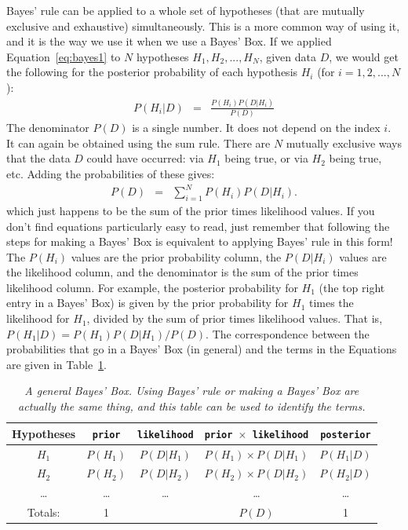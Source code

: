 Bayes' rule can be applied to a whole set
of hypotheses (that are mutually exclusive and exhaustive) simultaneously.
This is a more common way of using it, and it is the way we use it when we use
a Bayes' Box. If we applied Equation~\ref{eq:bayes1} to $N$ hypotheses
$H_1, H_2, ..., H_N$, given data $D$, we would get the following for the posterior
probability of each hypothesis $H_i$ (for $i=1, 2, ..., N$):
\begin{eqnarray}
P(H_i|D) &=& \frac{P(H_i)P(D|H_i)}{P(D)}
\end{eqnarray}
The denominator $P(D)$ is a single number. It does not depend on the index $i$.
It can again be obtained using the sum rule. There are $N$
mutually exclusive ways that the data $D$ could have occurred: via $H_1$ being
true, or via $H_2$ being true, etc. Adding the probabilities of these gives:
\begin{eqnarray}
P(D) &=& \sum_{i=1}^N P(H_i)P(D|H_i).
\end{eqnarray}
which just happens to be the sum of the prior times likelihood values.
If you don't find equations particularly easy to read, just remember that
following the steps for making a Bayes' Box is equivalent to applying
Bayes' rule in this form! The $P(H_i)$ values are the prior probability column, the
$P(D|H_i)$ values are the likelihood column, and the denominator is the
sum of the prior times likelihood column. For example, the posterior probability
for $H_1$ (the top right entry in a Bayes' Box) is given by the prior probability
for $H_1$ times the likelihood for $H_1$, divided by the sum of prior times
likelihood values. That is, $P(H_1|D) = P(H_1)P(D|H_1)/P(D)$.
The correspondence between the probabilities that go in a Bayes'
Box (in general) and the terms in the Equations are given in
Table~\ref{tab:general_bayes_box}.

\begin{table}[!ht]
\begin{center}
\begin{tabular}{|c|c|c|c|c|}
\hline
{\bf Hypotheses} & {\tt prior} & {\tt likelihood} &
{\tt prior $\times$ likelihood} & {\tt posterior}\\
\hline
$H_1$ & $P(H_1)$ & $P(D|H_1)$ & $P(H_1)\times P(D|H_1)$ & $P(H_1|D)$\\
$H_2$ & $P(H_2)$ & $P(D|H_2)$ & $P(H_2)\times P(D|H_2)$ & $P(H_2|D)$\\
\ldots & \ldots & \ldots & \ldots & \ldots\\
\hline
Totals: & 1 & & $P(D)$ & 1\\
\hline
\end{tabular}
\caption{\it A general Bayes' Box. Using Bayes' rule or making a Bayes' Box are
actually the same thing, and this table can be used to identify the
terms.\label{tab:general_bayes_box}}
\end{center}
\end{table}

